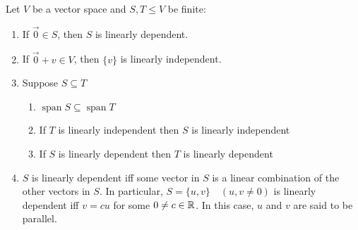 \begin{remark}
Let $V$ be a vector space and $S, T \leq V$ be finite:
\begin{enumerate}
    \item If $\vec{0} \in S$, then $S$ is linearly dependent.
    \item If $\vec{0} + v \in V$, then $\{v\}$ is linearly independent.
    \item Suppose $S \subseteq T$
    \begin{enumerate}
        \item $\operatorname{span}S \subseteq \operatorname{span}T$
        \item If $T$ is linearly independent then $S$ is linearly independent
        \item If $S$ is linearly dependent then $T$ is linearly dependent
    \end{enumerate}
    \item $S$ is linearly dependent iff some vector in $S$ is a linear combination of the other vectors in $S$. In particular, $S = \{u, v\}\quad(u, v \ne 0)$ is linearly dependent iff $v = cu$ for some $0 \ne c \in \mathbb{R}$. In this case, $u$ and $v$ are said to be parallel.
\end{enumerate}
\end{remark}